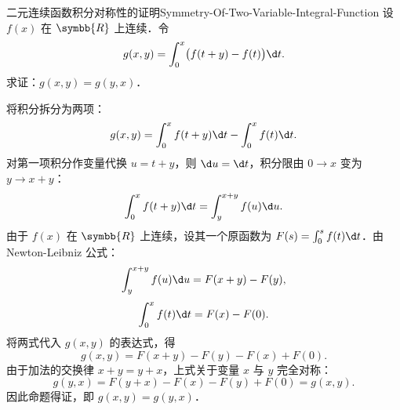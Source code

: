 \begin{problem}{二元连续函数积分对称性的证明}{Symmetry-Of-Two-Variable-Integral-Function}
    设 $f(x)$ 在 $\symbb{R}$ 上连续．令
    \begin{equation}
        g(x, y) = \int_0^x \bigl(f(t + y) - f(t)\bigr) \d t.
    \end{equation}
    求证：$g(x, y) = g(y, x)$．
\end{problem}

\begin{myproof}
    将积分拆分为两项：
    \begin{equation}
        g(x, y) = \int_0^x f(t + y) \d t - \int_0^x f(t) \d t.
    \end{equation}
    对第一项积分作变量代换 $u = t + y$，则 $\d u = \d t$，积分限由 $0 \to x$ 变为 $y \to x + y$：
    \begin{equation}
        \int_0^x f(t + y) \d t = \int_y^{x+y} f(u) \d u.
    \end{equation}
    由于 $f(x)$ 在 $\symbb{R}$ 上连续，设其一个原函数为 $F(s) = \int_0^s f(t) \d t$．由 Newton-Leibniz 公式：
    \begin{equation}
        \int_y^{x+y} f(u) \d u = F(x + y) - F(y),
    \end{equation}
    \begin{equation}
        \int_0^x f(t) \d t = F(x) - F(0).
    \end{equation}
    将两式代入 $g(x, y)$ 的表达式，得
    \begin{equation}
        g(x, y) = F(x + y) - F(y) - F(x) + F(0).
    \end{equation}
    由于加法的交换律 $x + y = y + x$，上式关于变量 $x$ 与 $y$ 完全对称：
    \begin{equation}
        g(y, x) = F(y + x) - F(x) - F(y) + F(0) = g(x, y).
    \end{equation}
    因此命题得证，即 $g(x, y) = g(y, x)$．
\end{myproof}

\endinput
